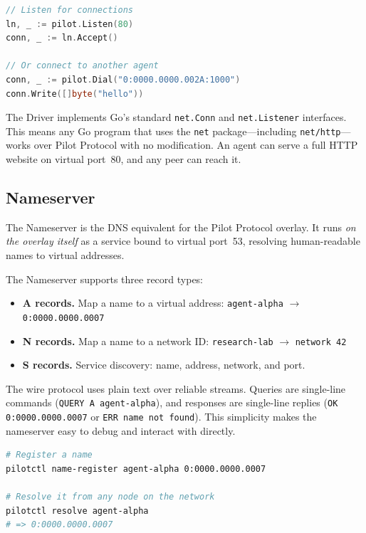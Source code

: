 \documentclass[11pt,a4paper]{article}
\begin{document}
\begin{lstlisting}[language=Go]
// Listen for connections
ln, _ := pilot.Listen(80)
conn, _ := ln.Accept()

// Or connect to another agent
conn, _ := pilot.Dial("0:0000.0000.002A:1000")
conn.Write([]byte("hello"))
\end{lstlisting}

The Driver implements Go's standard \texttt{net.Conn} and \texttt{net.Listener} interfaces. This means any Go program that uses the \texttt{net} package---including \texttt{net/http}---works over Pilot Protocol with no modification. An agent can serve a full HTTP website on virtual port~80, and any peer can reach it.

\subsection{Nameserver}

The Nameserver is the DNS equivalent for the Pilot Protocol overlay. It runs \emph{on the overlay itself} as a service bound to virtual port~53, resolving human-readable names to virtual addresses.

The Nameserver supports three record types:

\begin{itemize}
    \item \textbf{A records.} Map a name to a virtual address: \texttt{agent-alpha} $\rightarrow$ \texttt{0:0000.0000.0007}
    \item \textbf{N records.} Map a name to a network ID: \texttt{research-lab} $\rightarrow$ \texttt{network 42}
    \item \textbf{S records.} Service discovery: name, address, network, and port.
\end{itemize}

The wire protocol uses plain text over reliable streams. Queries are single-line commands (\texttt{QUERY A agent-alpha}), and responses are single-line replies (\texttt{OK 0:0000.0000.0007} or \texttt{ERR name not found}). This simplicity makes the nameserver easy to debug and interact with directly.

\begin{lstlisting}[language=bash]
# Register a name
pilotctl name-register agent-alpha 0:0000.0000.0007

# Resolve it from any node on the network
pilotctl resolve agent-alpha
# => 0:0000.0000.0007
\end{lstlisting}
\end{document}
